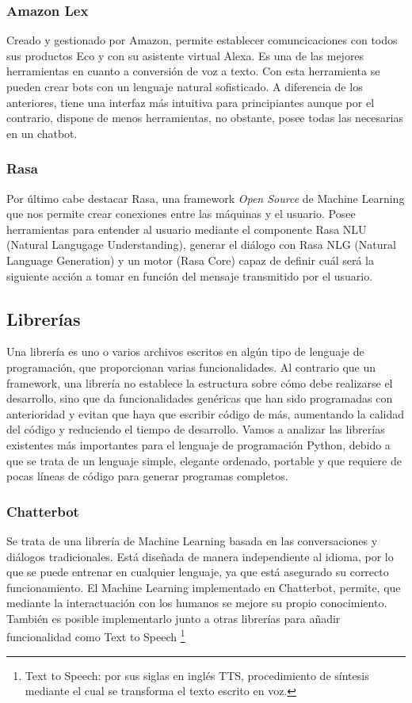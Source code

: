 \subsubsection{Amazon Lex}
Creado y gestionado por Amazon, permite establecer comuncicaciones con todos sus productos Eco y con su asistente virtual Alexa. Es una de las mejores herramientas en cuanto a conversión de voz a texto. Con esta herramienta se pueden crear bots con un lenguaje natural sofisticado. A diferencia de los anteriores, tiene una interfaz más intuitiva para principiantes aunque por el contrario, dispone de menos herramientas, no obstante, posee todas las necesarias en un chatbot.

\subsubsection{Rasa}
Por último cabe destacar Rasa, una framework \textit{Open Source} de Machine Learning que nos permite crear conexiones entre las máquinas y el usuario. Posee herramientas para entender al usuario mediante el componente Rasa NLU (Natural Langugage Understanding), generar el diálogo con Rasa NLG (Natural Language Generation) y un motor (Rasa Core) capaz de definir cuál será la siguiente acción a tomar en función del mensaje transmitido por el usuario.   


\subsection{Librerías}

Una librería es uno o varios archivos escritos en algún tipo de lenguaje de programación, que proporcionan varias funcionalidades. Al contrario que un framework, una librería no establece la estructura sobre cómo debe realizarse el desarrollo, sino que da funcionalidades genéricas que han sido programadas con anterioridad y evitan que haya que escribir código de más, aumentando la calidad del código y reduciendo el tiempo de desarrollo.
Vamos a analizar las librerías existentes más importantes para el lenguaje de programación Python, debido a que se trata de un lenguaje simple, elegante ordenado, portable y que requiere de pocas líneas de código para generar programas completos.

\subsubsection{Chatterbot}
Se trata de una librería de Machine Learning basada en las conversaciones y diálogos tradicionales. Está diseñada de manera independiente al idioma, por lo que se puede entrenar en cualquier lenguaje, ya que está asegurado su correcto funcionamiento. 
El Machine Learning implementado en Chatterbot, permite, que mediante la interactuación con los humanos se mejore su propio conocimiento. También es posible implementarlo junto a otras librerías para añadir funcionalidad como Text to Speech \footnote{Text to Speech: por sus siglas en inglés TTS, procedimiento de síntesis mediante el cual se transforma el texto escrito en voz.}

